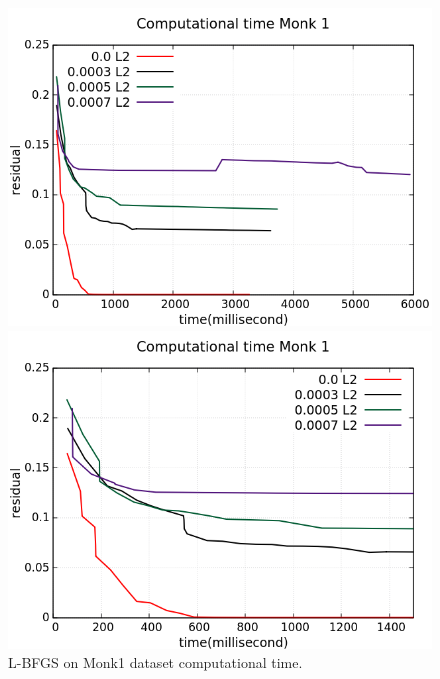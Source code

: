 \begin{figure}[H]
	\centering
	\begin{minipage}[t]{0.5\linewidth}
		\includegraphics[width=\linewidth]{data/LBFGS/Monk1/Monk1_LBFGS_L2_CT_standard.png}
	\end{minipage}%
	\begin{minipage}[t]{0.5\linewidth}
		\includegraphics[width=\linewidth]{data/LBFGS/Monk1/Monk1_LBFGS_L2_CT_zoom.png}
	\end{minipage}
	\caption{L-BFGS on Monk1 dataset computational time.}
\end{figure}
